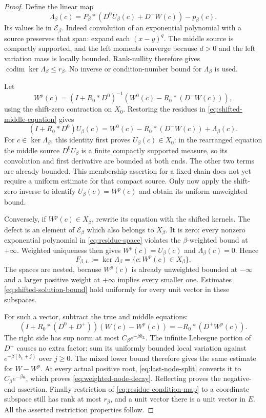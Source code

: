 \begin{proof}
Define the linear map
\begin{equation}\label{eq:residue-condition-map}
 \Lambda_\beta(c)
  =P_\beta*(D^0U_\beta(c)+D^-W(c))-p_\beta(c).
\end{equation}
Its values lie in $\mathcal E_\beta$.  Indeed convolution of an
exponential polynomial with a source preserves that span:
expand each $(x-y)^q$.  The middle source is compactly supported,
and the left moments converge because $d>0$ and the left
variation mass is locally bounded.  Rank-nullity therefore gives
$\operatorname{codim}\ker\Lambda_\beta\le r_\beta$.
No inverse or condition-number bound for $\Lambda_\beta$ is used.

Let
\[
 W^p(c)=(I+R_0*D^0)^{-1}
             (W^0(c)-R_0*(D^-W(c))),
\]
using the shift-zero contraction on $X_0$.
Restoring the residues in \eqref{eq:shifted-middle-equation} gives
\[
 (I+R_0*D^0)U_\beta(c)
  =W^0(c)-R_0*(D^-W(c))+\Lambda_\beta(c).
\]
For $c\in\ker\Lambda_\beta$, this identity first proves
$U_\beta(c)\in X_0$: in the rearranged equation the middle
source $D^0U_\beta$ is a finite compactly supported measure,
so its convolution and first derivative are bounded at both
ends.  The other two terms are already bounded.
This membership assertion for a fixed chain does not yet require
a uniform estimate for that compact source.  Only now apply the
shift-zero inverse to identify $U_\beta(c)=W^p(c)$ and obtain
its uniform unweighted bound.

Conversely, if $W^p(c)\in X_\beta$, rewrite its equation with
the shifted kernels.  The defect is an element of
$\mathcal E_\beta$ which also belongs to $X_\beta$.
It is zero: every nonzero exponential polynomial in
\eqref{eq:residue-space} violates the $\beta$-weighted bound at
$+\infty$.  Weighted uniqueness then gives
$W^p(c)=U_\beta(c)$ and $\Lambda_\beta(c)=0$.
Hence
\begin{equation}\label{eq:flag-membership}
 F_{\beta,L}:=\ker\Lambda_\beta
       =\{c:W^p(c)\in X_\beta\}.
\end{equation}
The spaces are nested, because $W^p(c)$ is already unweighted
bounded at $-\infty$ and a larger positive weight at $+\infty$
implies every smaller one.  Estimates
\eqref{eq:shifted-solution-bound} hold uniformly for every unit
vector in these subspaces.

For such a vector, subtract the true and middle equations:
\[
 (I+R_0*(D^0+D^+))(W(c)-W^p(c))
       =-R_0*(D^+W^p(c)).
\]
The right side has sup norm at most $C_\beta e^{-\beta b_L}$.
The infinite Lebesgue portion of $D^+$ causes no extra factor:
sum its uniformly bounded local variation against
$e^{-\beta(b_L+j)}$ over $j\ge0$.
The mixed lower bound therefore gives the same estimate for
$W-W^p$.  At every actual positive root,
\eqref{eq:last-node-split} converts it to
$C_\beta e^{-\beta u}$, which proves
\eqref{eq:weighted-node-decay}.
Reflecting proves the negative-end assertion.
Finally restriction of \eqref{eq:residue-condition-map} to a
coordinate subspace still has rank at most $r_\beta$, and a unit
vector there is a unit vector in $E$.  All the asserted
restriction properties follow.
\end{proof}

